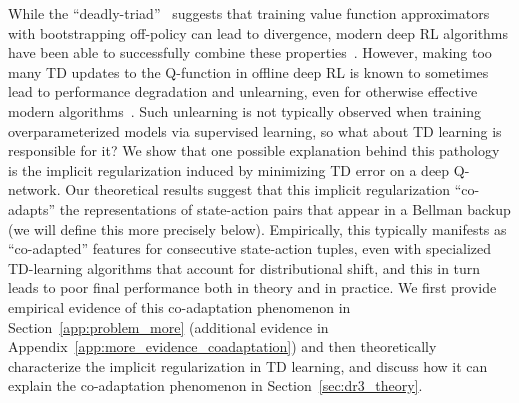 While the ``deadly-triad''~\citep{suttonrlbook} suggests that training value function approximators with bootstrapping off-policy can lead to divergence, modern deep RL algorithms have been able to successfully combine these properties~\citep{Hasselt2018DeepRL}. However, making too many TD updates to the Q-function in offline deep RL is known to sometimes lead to performance degradation and unlearning, even for otherwise effective modern algorithms~\citep{fu2019diagnosing, fedus2020revisiting,agarwal2019optimistic,kumar2021implicit}. Such unlearning is not typically observed when training overparameterized models via supervised learning, so what about TD learning is responsible for it? We show that one possible explanation behind this pathology is the implicit regularization induced by minimizing TD error on a deep Q-network. Our theoretical results suggest that this implicit regularization ``co-adapts'' the representations of state-action pairs that appear in a Bellman backup (we will define this more precisely below).
Empirically, this typically manifests as ``co-adapted'' features for consecutive state-action tuples, even with specialized TD-learning algorithms that account for distributional shift, and this in turn leads to poor final performance both in theory and in practice. We first provide empirical evidence of this co-adaptation phenomenon in Section~\ref{app:problem_more} (additional evidence in Appendix~\ref{app:more_evidence_coadaptation}) and then theoretically characterize the implicit regularization in TD learning, and discuss how it can explain the co-adaptation phenomenon in Section~\ref{sec:dr3_theory}.


